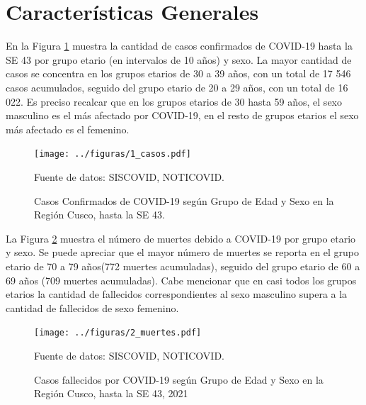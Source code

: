 \documentclass[12pt,a4paper,openany]{book}
\begin{document}
	
	\clearpage	
	\section*{Características Generales}
	
	
	
 	\noindent En la Figura \ref{fig:casos_edad_sexo} muestra la cantidad de casos confirmados de COVID-19 hasta la SE 43 por grupo etario (en intervalos de 10 años) y sexo. La mayor cantidad de casos se concentra en los grupos etarios de 30 a 39 años, con un total de 17 546 casos acumulados, seguido del grupo etario de 20 a 29 años, con un total de 16 022. Es preciso recalcar que en los grupos etarios de 30 hasta 59 años, el sexo masculino es el más afectado por COVID-19, en el resto de grupos etarios el sexo más afectado es el femenino. 
 	
 	
 	
	\begin{figure}[h]
		\caption{Casos Confirmados de COVID-19 según Grupo de Edad y Sexo en la Región Cusco, hasta la SE 43.}\label{fig:casos_edad_sexo}
		\begin{center}
			\texttt{[image: ../figuras/1\_casos.pdf]}
		\end{center}
		{\footnotesize {Fuente de datos: SISCOVID, NOTICOVID.}}
	\end{figure}
\pagebreak

La Figura  \ref{fig:fallecidos_edad_sexo}  muestra el número de muertes debido a COVID-19 por grupo etario y sexo. Se puede apreciar que el mayor número de muertes se reporta en el grupo etario de 70 a 79 años(772 muertes acumuladas), seguido del grupo etario de 60 a 69 años (709 muertes acumuladas). Cabe mencionar que en casi todos los grupos etarios la cantidad de fallecidos correspondientes al sexo masculino supera a la cantidad de fallecidos de sexo femenino.
	\begin{figure}[h]
		\caption{Casos fallecidos por COVID-19 según Grupo de Edad y Sexo en la Región Cusco, hasta la SE 43, 2021}\label{fig:fallecidos_edad_sexo}
		\begin{center}
			\texttt{[image: ../figuras/2\_muertes.pdf]}
		\end{center}
		{\footnotesize {Fuente de datos: SISCOVID, NOTICOVID.}}
	\end{figure}
\end{document}
